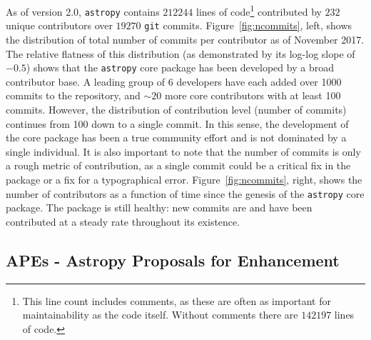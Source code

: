 \documentclass[modern]{aastex61}
\newcommand{\package}[1]{\texttt{#1}\xspace}
\newcommand{\astropypkg}{\package{astropy}}
\renewcommand{\figurename}{Figure\xspace}
\begin{document}
As of version 2.0, \astropypkg contains $212244$ lines of code\footnote{This
line count includes comments, as these are often as important for
maintainability as the code itself.  Without comments there are $142197$ lines
of code.} contributed by $232$ unique contributors over $19270$ \texttt{git}
commits.
\figurename~\ref{fig:ncommits}, left, shows the distribution of total number of
commits per contributor as of November 2017.
The relative flatness of this distribution (as demonstrated by its log-log slope of
$-0.5$) shows that the \astropypkg core package has been developed by a broad
contributor base.  A leading group of 6 developers have each added over 1000
commits to the repository, and $\sim 20$ more core contributors with at least
100 commits.
However, the distribution of contribution level (number of commits) continues
from 100 down to a single commit.
In this sense, the development of the core package has been a true community
effort and is not dominated by a single individual.
It is also important to note that the number of commits is only a rough metric
of contribution, as a single commit could be a critical fix in the package or a
fix for a typographical error.
\figurename~\ref{fig:ncommits}, right, shows the number of contributors as a
function of time since the genesis of the \astropypkg core package.
The package is still healthy: new commits are and have been contributed at a
steady rate throughout its existence.

\subsection{APEs - Astropy Proposals for Enhancement}
\end{document}
